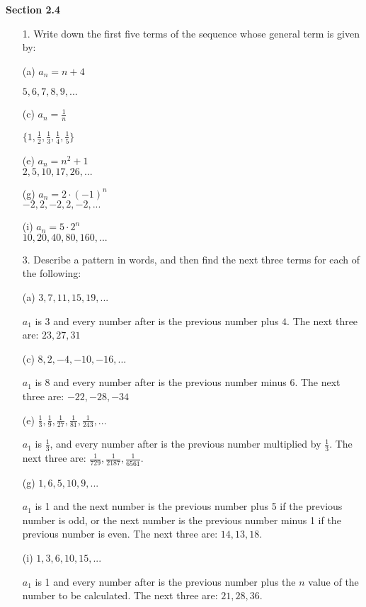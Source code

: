 \documentclass{article}
\begin{document}
\textbf{Section 2.4}

\begin{itemize}
    \item[1.] Write down the first five terms of the sequence whose general term is given by:
    
    (a) $a_n=n+4$
    
    {\color{blue}$5,6,7,8,9,...$}
    
    (c) $a_n=\frac{1}{n}$
    
    {\color{blue}$\{1,\frac{1}{2},\frac{1}{3},\frac{1}{4},\frac{1}{5}\}$}
    
    (e) $a_n=n^2+1$\\
    {\color{blue}$2,5,10,17,26,...$}
    
    (g) $a_n=2\cdot(-1)^n$\\
    {\color{blue}$-2,2,-2,2,-2,...$}
    
    (i) $a_n=5\cdot2^n$\\
    {\color{blue}$10,20,40,80,160,...$}
    
    \item[3.] Describe a pattern in words, and then find the next three terms for each of the following:
    
    (a) $3, 7, 11, 15, 19, ...$
    
    {\color{blue} $a_1$ is 3 and every number after is the previous number plus $4$. The next three are: $23, 27, 31$}
    
    (c) $8, 2, -4, -10, -16, ...$
    
    {\color{blue} $a_1$ is 8 and every number after is the previous number minus 6. The next three are: $-22,-28,-34$}
    
    (e) $\frac{1}{3}, \frac{1}{9}, \frac{1}{27}, \frac{1}{81}, \frac{1}{243}, ...$
    
    {\color{blue} $a_1$ is $\frac{1}{3}$, and every number after is the previous number multiplied by $\frac{1}{3}$. The next three are: $\frac{1}{729}, \frac{1}{2187}, \frac{1}{6561}$.}
    
    (g) $1, 6, 5, 10, 9, ...$
    
    {\color{blue} $a_1$ is 1 and the next number is the previous number plus 5 if the previous number is odd, or the next number is the previous number minus 1 if the previous number is even. The next three are: $14, 13, 18$.}
    
    (i) $1, 3, 6, 10, 15, ...$
    
    {\color{blue} $a_1$ is 1 and every number after is the previous number plus the $n$ value of the number to be calculated. The next three are: $21, 28, 36$. }
    

\end{itemize}
\end{document}
